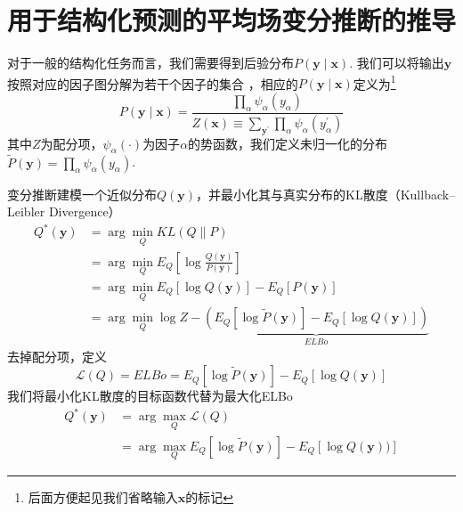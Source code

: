 \chapter{用于结构化预测的平均场变分推断的推导}
\label{appendix:mfvi-derivation}
对于一般的结构化任务而言，我们需要得到后验分布$P(\boldsymbol{y}\mid\boldsymbol{x})$.
我们可以将输出$\boldsymbol{y}$按照对应的因子图分解为若干个因子的集合 \citep{sutton-etal-2012-crf}，相应的$P(\boldsymbol{y}\mid\boldsymbol{x})$定义为\footnote{后面方便起见我们省略输入$\boldsymbol{x}$的标记}
\begin{equation}\label{eq:posterior}
  P(\boldsymbol{y}\mid\boldsymbol{x}) =\frac{\prod_{\alpha} \psi_{\alpha}(y_{\alpha})}{Z(\boldsymbol{x})\equiv\sum_{\boldsymbol{y}^{\prime}}\prod_{\alpha} \psi_{\alpha}(y^{\prime}_{\alpha})}
\end{equation}
其中$Z$为配分项，$\psi_{\alpha}(\cdot)$为因子$\alpha$的势函数，我们定义未归一化的分布$\tilde{P}(\boldsymbol{y})=\prod_{\alpha} \psi_{\alpha}(y_{\alpha})$.

变分推断建模一个近似分布$Q(\boldsymbol{y})$，并最小化其与真实分布的KL散度（Kullback–Leibler Divergence）
\begin{equation}
  \begin{split}
    Q^{\ast}(\boldsymbol{y})
    &=\arg\min_{Q} KL(Q\|P)\\
    &=\arg\min_{Q} E_{Q}\left[\log\frac{Q(\boldsymbol{y})}{P(\boldsymbol{y})}\right]\\
    &=\arg\min_{Q} E_{Q}\left[\log Q(\boldsymbol{y})\right] - E_{Q}\left[P(\boldsymbol{y})\right]\\
    &=\arg\min_{Q} \log Z-\underbrace{\left(E_{Q}\left[\log \tilde{P}(\boldsymbol{y})\right]-E_{Q}\left[\log Q(\boldsymbol{y})\right]\right)}_{ELBo}
  \end{split}
\end{equation}
去掉配分项，定义
\begin{equation}
  \mathcal{L}(Q)=ELBo=E_{Q}\left[\log \tilde{P}(\boldsymbol{y})\right]-E_{Q}\left[\log Q(\boldsymbol{y})\right]
\end{equation}
我们将最小化KL散度的目标函数代替为最大化ELBo
\begin{equation}
  \begin{split}
    Q^{\ast}(\boldsymbol{y}) &= \arg\max_{Q}\mathcal{L}(Q)\\
    &= \arg\max_{Q}E_{Q}\left[\log \tilde{P}(\boldsymbol{y})\right]-E_{Q}\left[\log Q(\boldsymbol{y}))\right]
  \end{split}
\end{equation}


